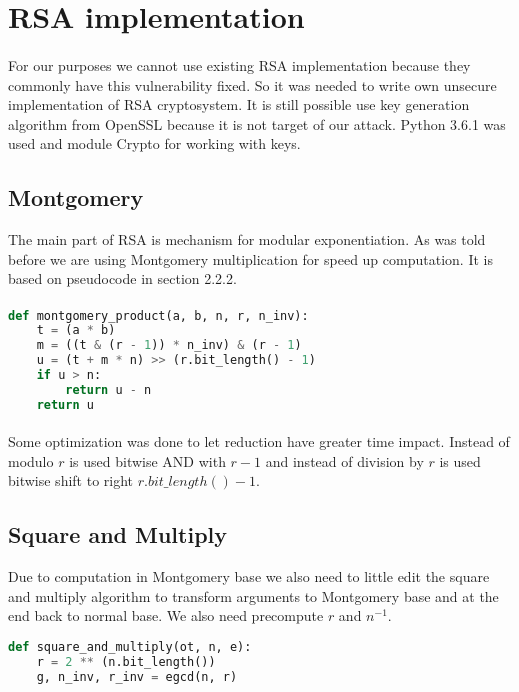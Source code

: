 \documentclass[thesis=B,english]{FITthesis}[2012/10/20]
\begin{document}
{\section{RSA implementation}

\paragraph*{}{
For our purposes we cannot use existing RSA implementation because they commonly have this vulnerability fixed. So it was needed to write own unsecure implementation of RSA cryptosystem.
It is still possible use key generation algorithm from OpenSSL because it is not target of our attack. Python 3.6.1 was used and module Crypto for working with keys.
}
\subsection{Montgomery}{
The main part of RSA is mechanism for modular exponentiation. As was told before we are using Montgomery multiplication for speed up computation. It is based on pseudocode in section 2.2.2.
}
\paragraph*{}
\begin{lstlisting}[language=Python]
def montgomery_product(a, b, n, r, n_inv):
    t = (a * b)
    m = ((t & (r - 1)) * n_inv) & (r - 1)
    u = (t + m * n) >> (r.bit_length() - 1)
    if u > n:
        return u - n
    return u
\end{lstlisting}

\paragraph*{}{
Some optimization was done to let reduction have greater time impact. Instead of modulo \(r\) is used bitwise AND with \(r-1\) and instead of division by \(r\) is used bitwise
shift to right \(r.bit\_length() - 1\).
}

\subsection{Square and Multiply}{
Due to computation in Montgomery base we also need to little edit the square and multiply algorithm to transform arguments to Montgomery base and at the end back to normal base.
We also need precompute \(r\) and \(n^{-1}\).
}

\begin{lstlisting}[language=Python]
 def square_and_multiply(ot, n, e):
    r = 2 ** (n.bit_length())
    g, n_inv, r_inv = egcd(n, r)


\end{lstlisting}}
\end{document}
